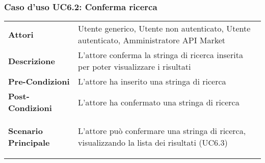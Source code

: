 \subsubsection{Caso d'uso UC6.2: Conferma ricerca}
\label{UC6_2}

\begin{minipage}{\linewidth}
	\begin{tabular}{ l | p{11cm}}
		\hline
		\rowcolor{Gray}
		\multicolumn{2}{c}{UC6.2 - Conferma ricerca} \\
		\hline
		\textbf{Attori} & Utente generico, Utente non autenticato, Utente autenticato, Amministratore API Market \\
		\textbf{Descrizione} & L'attore conferma la stringa di ricerca inserita per poter visualizzare i risultati \\
		\textbf{Pre-Condizioni} & L'attore ha inserito una stringa di ricerca \\
		\textbf{Post-Condizioni} & L'attore ha confermato una stringa di ricerca \\
		\textbf{Scenario Principale} & 
		\begin{enumerate*}[label=(\arabic*.),itemjoin={\newline}]
			\item L'attore può confermare una stringa di ricerca, visualizzando la lista dei risultati (UC6.3)
		\end{enumerate*}\\
	\end{tabular}
\end{minipage}